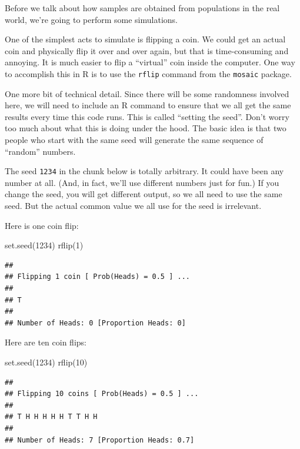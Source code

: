\documentclass[
]{book}
\newenvironment{Shaded}{\begin{snugshade}}{\end{snugshade}}
\newcommand{\DecValTok}[1]{\textcolor[rgb]{0.00,0.00,0.81}{#1}}
\newcommand{\FunctionTok}[1]{\textcolor[rgb]{0.00,0.00,0.00}{#1}}
\newcommand{\NormalTok}[1]{#1}
\begin{document}
Before we talk about how samples are obtained from populations in the real world, we're going to perform some simulations.

One of the simplest acts to simulate is flipping a coin. We could get an actual coin and physically flip it over and over again, but that is time-consuming and annoying. It is much easier to flip a ``virtual'' coin inside the computer. One way to accomplish this in R is to use the \texttt{rflip} command from the \texttt{mosaic} package.

One more bit of technical detail. Since there will be some randomness involved here, we will need to include an R command to ensure that we all get the same results every time this code runs. This is called ``setting the seed''. Don't worry too much about what this is doing under the hood. The basic idea is that two people who start with the same seed will generate the same sequence of ``random'' numbers.

The seed \texttt{1234} in the chunk below is totally arbitrary. It could have been any number at all. (And, in fact, we'll use different numbers just for fun.) If you change the seed, you will get different output, so we all need to use the same seed. But the actual common value we all use for the seed is irrelevant.

Here is one coin flip:

\begin{Shaded}
\begin{Highlighting}[]
\FunctionTok{set.seed}\NormalTok{(}\DecValTok{1234}\NormalTok{)}
\FunctionTok{rflip}\NormalTok{(}\DecValTok{1}\NormalTok{)}
\end{Highlighting}
\end{Shaded}

\begin{verbatim}
## 
## Flipping 1 coin [ Prob(Heads) = 0.5 ] ...
## 
## T
## 
## Number of Heads: 0 [Proportion Heads: 0]
\end{verbatim}

Here are ten coin flips:

\begin{Shaded}
\begin{Highlighting}[]
\FunctionTok{set.seed}\NormalTok{(}\DecValTok{1234}\NormalTok{)}
\FunctionTok{rflip}\NormalTok{(}\DecValTok{10}\NormalTok{)}
\end{Highlighting}
\end{Shaded}

\begin{verbatim}
## 
## Flipping 10 coins [ Prob(Heads) = 0.5 ] ...
## 
## T H H H H H T T H H
## 
## Number of Heads: 7 [Proportion Heads: 0.7]
\end{verbatim}
\end{document}
